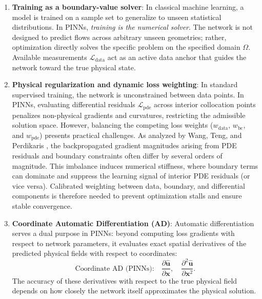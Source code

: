 \begin{enumerate}
    \item \textbf{Training as a boundary-value solver}:
    In classical machine learning, a model is trained on a sample set to generalize to unseen statistical distributions.
    In PINNs, \textit{training is the numerical solver}.
    The network is not designed to predict flows across arbitrary unseen geometries;
    rather, optimization directly solves the specific problem on the specified domain $\Omega$.
    Available measurements $\mathcal{L}_{\mathrm{data}}$ act as an active data anchor that
    guides the network toward the true physical state.

    \item \textbf{Physical regularization and dynamic loss weighting}:
    In standard supervised training, the network is unconstrained between data points.
    In PINNs, evaluating differential residuals $\mathcal{L}_{\mathrm{pde}}$ across interior collocation points
    penalizes non-physical gradients and curvatures, restricting the admissible solution space.
    However, balancing the competing loss weights ($w_{\mathrm{data}}$, $w_{\mathrm{bc}}$, and $w_{\mathrm{pde}}$) presents practical challenges.
    As analyzed by Wang, Teng, and Perdikaris \cite{wang2021understanding}, the backpropagated gradient magnitudes arising from PDE residuals and boundary constraints often differ by several orders of magnitude.
    This imbalance induces numerical stiffness, where boundary terms can dominate and suppress the learning signal of interior PDE residuals (or vice versa).
    Calibrated weighting between data, boundary, and differential components is therefore needed to prevent optimization stalls and ensure stable convergence.

    \item \textbf{Coordinate Automatic Differentiation (AD)}:
    Automatic differentiation serves a dual purpose in PINNs:
    beyond computing loss gradients with respect to network parameters, it evaluates exact 
    spatial derivatives of the predicted physical fields with respect to coordinates:
    \begin{equation}
        \text{Coordinate AD (PINNs):} \quad \frac{\partial \hat{\boldsymbol{u}}}{\partial \boldsymbol{x}}, \quad \frac{\partial^2 \hat{\boldsymbol{u}}}{\partial \boldsymbol{x}^2} .
    \end{equation}
    The accuracy of these derivatives with respect to the true physical field
    depends on how closely the network itself approximates the physical solution.


\end{enumerate}
